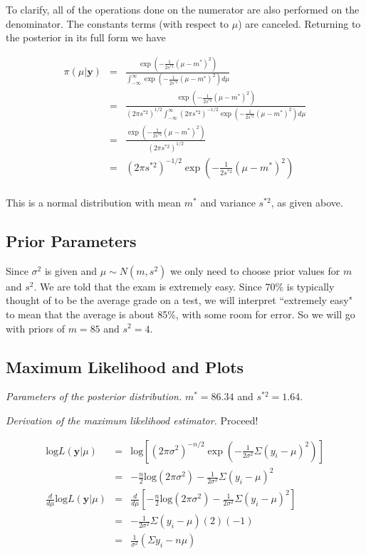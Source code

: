 \documentclass[12pt]{article}
\begin{document}
\noindent To clarify, all of the operations done on the numerator are also performed on the denominator. The constants terms (with respect to $\mu$) are canceled. Returning to the posterior in its full form we have

\begin{eqnarray*}
\pi(\mu|\mathbf{y}) &=& \frac{\exp(-\frac{1}{2s^{*2}}(\mu-m^*)^2)}{\int_{-\infty}^\infty \exp(-\frac{1}{2s^{*2}}(\mu-m^*)^2)d\mu} \\
&=& \frac{\exp(-\frac{1}{2s^{*2}}(\mu-m^*)^2)}{(2\pi s^{*2})^{1/2}\int_{-\infty}^\infty(2\pi s^{*2})^{-1/2}\exp(-\frac{1}{2s^{*2}}(\mu-m^*)^2)d\mu} \\
&=& \frac{\exp(-\frac{1}{2s^{*2}}(\mu-m^*)^2)}{(2\pi s^{*2})^{1/2}} \\
&=& (2\pi s^{*2})^{-1/2}\exp\left(-\frac{1}{2s^{*2}}(\mu-m^*)^2\right) \\
\end{eqnarray*}

\noindent This is a normal distribution with mean $m^*$ and variance $s^{*2}$, as given above.

\subsection{Prior Parameters}

\noindent Since $\sigma^2$ is given and $\mu\sim N(m,s^2)$ we only need to choose prior values for $m$ and $s^2$.  We are told that the exam is extremely easy.  Since 70\% is typically thought of to be the average grade on a test, we will interpret ``extremely easy" to mean that the average is about 85\%, with some room for error.  So we will go with priors of $m=85$ and $s^2=4$.
\bigskip

\subsection{Maximum Likelihood and Plots}

\noindent \emph{Parameters of the posterior distribution.} $m^*=86.34$ and $s^{*2}=1.64$.
\bigskip

\noindent \emph{Derivation of the maximum likelihood estimator.} Proceed!

\begin{eqnarray*}
\mathrm{log}L(\mathbf{y}|\mu) &=& \mathrm{log}\left[(2\pi\sigma^2)^{-n/2}\exp\left(-\frac{1}{2\sigma^2}\Sigma(y_i-\mu)^2\right)\right] \\
&=& -\frac{n}{2}\mathrm{log}(2\pi\sigma^2)-\frac{1}{2\sigma^2}\Sigma(y_i-\mu)^2 \\
\frac{d}{d\mu}\mathrm{log}L(\mathbf{y}|\mu) &=& \frac{d}{d\mu}\left[-\frac{n}{2}\mathrm{log}(2\pi\sigma^2)-\frac{1}{2\sigma^2}\Sigma(y_i-\mu)^2\right] \\
&=& -\frac{1}{2\sigma^2}\Sigma(y_i-\mu)(2)(-1) \\
&=& \frac{1}{\sigma^2}(\Sigma y_i-n\mu) \\
\end{eqnarray*}
\end{document}
